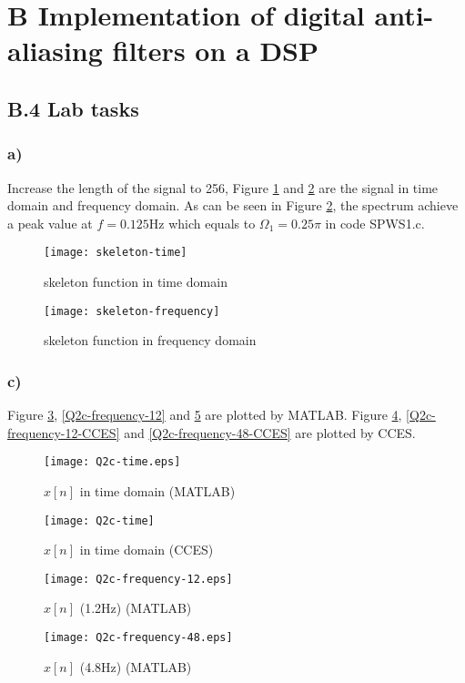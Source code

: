 \documentclass{article}
\newenvironment{homeworkProblem}[1]{
	\section*{#1}
	}{
}
\newenvironment{homeworkSection}[1]{
	\subsection*{#1}
	}{
}
\begin{document}
\begin{homeworkProblem}{B Implementation of digital anti-aliasing filters on a DSP}
\begin{homeworkSection}{B.4 Lab tasks}


\subsubsection*{a)}

Increase the length of the signal to 256, Figure \ref{skeleton-time} and \ref{skeleton-frequency} are the signal in time domain and frequency domain. As can be seen in Figure \ref{skeleton-frequency}, the spectrum achieve a peak value at $f=0.125\text{Hz}$ which equals to $\Omega_1=0.25\pi$ in code SPWS1.c. 

\begin{figure}[H]
\centering
\texttt{[image: skeleton-time]}
\caption{skeleton function in time domain}
\label{skeleton-time}
\end{figure}

\begin{figure}[H]
\centering
\texttt{[image: skeleton-frequency]}
\caption{skeleton function in frequency domain}
\label{skeleton-frequency}
\end{figure}


\subsubsection*{c)}

Figure \ref{Q2c-time}, \ref{Q2c-frequency-12} and \ref{Q2c-frequency-48} are plotted by MATLAB. Figure \ref{Q2c-time-CCES}, \ref{Q2c-frequency-12-CCES} and \ref{Q2c-frequency-48-CCES} are plotted by CCES.

\begin{figure}[H]
\centering
\texttt{[image: Q2c-time.eps]}
\caption{$x[n]$ in time domain (MATLAB)}
\label{Q2c-time}
\end{figure}

\begin{figure}[H]
\centering
\texttt{[image: Q2c-time]}
\caption{$x[n]$ in time domain (CCES)}
\label{Q2c-time-CCES}
\end{figure}

\begin{figure}[H]
\begin{minipage}[t]{0.5\linewidth}
\centering
\texttt{[image: Q2c-frequency-12.eps]}
\caption{$x[n]$ (1.2Hz) (MATLAB)}
\label{Q2c-frequency-12}
\end{minipage}
\begin{minipage}[t]{0.5\linewidth}
\centering
\texttt{[image: Q2c-frequency-48.eps]}
\caption{$x[n]$ (4.8Hz) (MATLAB)}
\label{Q2c-frequency-48}
\end{minipage}
\end{figure}


\end{homeworkSection}
\end{homeworkProblem}
\end{document}
